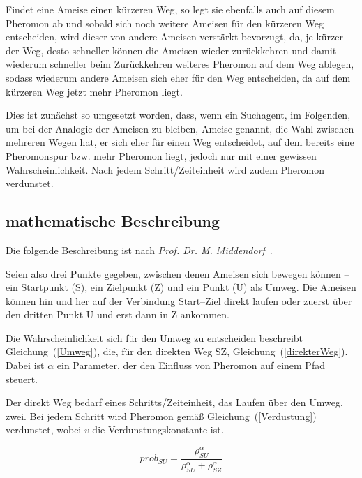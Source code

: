 \documentclass[fontsize=12, a4aper]{scrartcl}
\begin{document}
	Findet eine Ameise einen kürzeren Weg, so legt sie ebenfalls auch auf diesem Pheromon ab und sobald sich noch weitere Ameisen für den kürzeren Weg entscheiden, wird dieser von andere Ameisen verstärkt bevorzugt, da, je kürzer der Weg, desto schneller können die Ameisen wieder zurückkehren und damit wiederum schneller beim Zurückkehren weiteres Pheromon auf dem Weg ablegen, sodass wiederum andere Ameisen sich eher für den Weg entscheiden, da auf dem kürzeren Weg jetzt mehr Pheromon liegt.\hfill\newline
	
	Dies ist zunächst so umgesetzt worden, dass, wenn ein Suchagent, im Folgenden, um bei der Analogie der Ameisen zu bleiben, Ameise genannt, die Wahl zwischen mehreren Wegen hat, er sich eher für einen Weg entscheidet, auf dem bereits eine Pheromonspur bzw. mehr Pheromon liegt, jedoch nur mit einer gewissen Wahrscheinlichkeit. Nach jedem Schritt/Zeiteinheit wird zudem Pheromon verdunstet.\hfill\newline
	
	\newpage
	
	\subsection{mathematische Beschreibung}
	
	Die folgende Beschreibung ist nach \textit{Prof. Dr. M. Middendorf}~\cite{middendorf2017ant}.\hfill\newline
	
	Seien also drei Punkte gegeben, zwischen denen Ameisen sich bewegen können -- ein Startpunkt (S), ein Zielpunkt (Z) und ein Punkt (U) als Umweg. Die Ameisen können hin und her auf der Verbindung Start--Ziel direkt laufen oder zuerst über den dritten Punkt U und erst dann in Z ankommen.\hfill\newline
	
	Die Wahrscheinlichkeit sich für den Umweg zu entscheiden beschreibt Gleichung~(\ref{Umweg}), die, für den direkten Weg SZ, Gleichung~(\ref{direkterWeg}). Dabei ist \(\alpha\) ein Parameter, der den Einfluss von Pheromon auf einem Pfad steuert.\hfill\newline
	
	Der direkt Weg bedarf eines Schritts/Zeiteinheit, das Laufen über den Umweg, zwei. Bei jedem Schritt wird Pheromon gemäß Gleichung~(\ref{Verdustung}) verdunstet, wobei \(v\) die Verdunstungskonstante ist.\hfill\newline
	
	
	\begin{equation} \label{Umweg}
	prob_{SU} = \frac{\rho_{SU}^\alpha}{\rho_{SU}^\alpha+\rho_{SZ}^\alpha}
	\end{equation}
	
\end{document}
